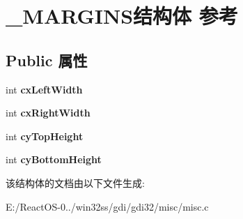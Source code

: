 \hypertarget{struct___m_a_r_g_i_n_s}{}\section{\+\_\+\+M\+A\+R\+G\+I\+N\+S结构体 参考}
\label{struct___m_a_r_g_i_n_s}
\subsection*{Public 属性}
\begin{DoxyCompactItemize}
\item 
\mbox{\label{struct___m_a_r_g_i_n_s_afedee47eaf236c841996d751c39c9ca1}} 
int {\bfseries cx\+Left\+Width}
\item 
\mbox{\label{struct___m_a_r_g_i_n_s_a782966141c7df773998d9cba7cd6d99a}} 
int {\bfseries cx\+Right\+Width}
\item 
\mbox{\label{struct___m_a_r_g_i_n_s_a721738991b56a2fd298ec4f44610237d}} 
int {\bfseries cy\+Top\+Height}
\item 
\mbox{\label{struct___m_a_r_g_i_n_s_a1c7c1595b7f30a395022076ea916c033}} 
int {\bfseries cy\+Bottom\+Height}
\end{DoxyCompactItemize}


该结构体的文档由以下文件生成\+:\begin{DoxyCompactItemize}
\item 
E\+:/\+React\+O\+S-\/0../win32ss/gdi/gdi32/misc/misc.\+c\end{DoxyCompactItemize}
